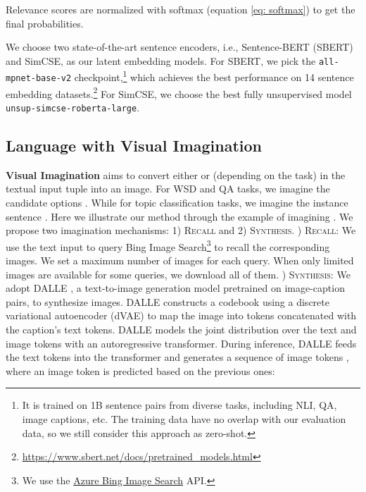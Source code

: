 \documentclass[11pt]{article}
\begin{document}
Relevance scores are normalized with softmax (equation \ref{eq: softmax}) to get the final probabilities.

We choose two state-of-the-art sentence encoders, i.e., Sentence-BERT (SBERT) \cite{reimers-gurevych-2019-sentence} and SimCSE, \cite{gao-etal-2021-simcse} as our latent embedding models. For SBERT, we pick the \texttt{all-mpnet-base-v2} checkpoint,\footnote{It is trained on 1B sentence pairs from diverse tasks, including NLI, QA, image captions, etc. The training data have no overlap with our evaluation data, so we still consider this approach as zero-shot.} which achieves the best performance on 14 sentence embedding datasets.\footnote{\href{https://www.sbert.net/docs/pretrained_models.html}{https://www.sbert.net/docs/pretrained\_models.html}} For SimCSE, we choose the best fully unsupervised model \texttt{unsup-simcse-roberta-large}.

\subsection{Language with Visual Imagination}
\medbreak
\noindent\textbf{Visual Imagination} aims to convert either  or  (depending on the task) in the textual input tuple  into an image. For WSD and QA tasks, we imagine the candidate options . While for topic classification tasks, we imagine the instance sentence . Here we illustrate our method through the example of imagining . We propose two imagination mechanisms: 1) \textsc{Recall} and 2) \textsc{Synthesis}.
\medbreak
{}) \textsc{Recall}: We use the text input to query Bing Image Search\footnote{We use the \href{https://learn.microsoft.com/en-us/azure/cognitive-services/bing-image-search/overview}{Azure Bing Image Search} API.} to recall the corresponding images. We set a maximum number of images for each query. When only limited images are available for some queries, we download all of them.
\medbreak
{}) \textsc{Synthesis}: We adopt DALLE \cite{ramesh2021zero}, a text-to-image generation model pretrained on image-caption pairs, to synthesize images. DALLE constructs a codebook  using a discrete variational autoencoder (dVAE) \cite{rolfe2016discrete} to map the image into tokens concatenated with the caption's text tokens. DALLE models the joint distribution over the text and image tokens with an autoregressive transformer. During inference, DALLE feeds the text tokens  into the transformer and generates a sequence of image tokens , where an image token  is predicted based on the previous ones:
\end{document}
